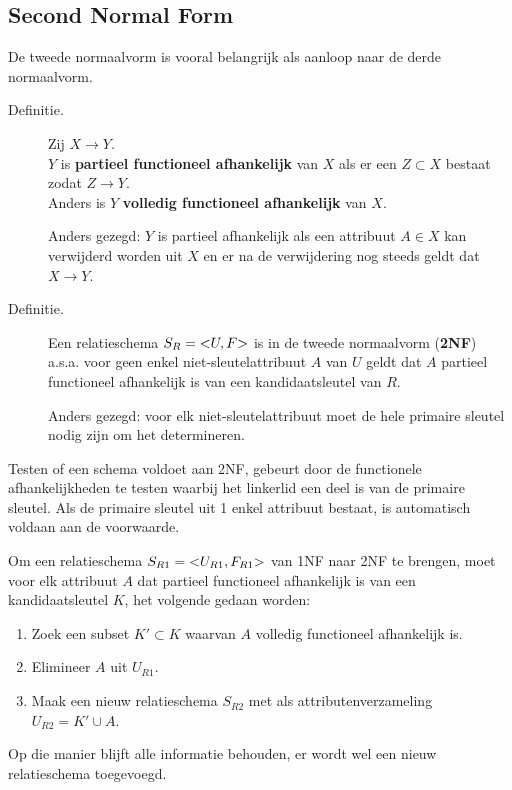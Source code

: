 \subsection{Second Normal Form}
De tweede normaalvorm is vooral belangrijk als aanloop naar de derde normaalvorm.
\begin{description}
	\item[Definitie.] Zij $X \rightarrow Y$.\\
	$Y$ is \textbf{partieel functioneel afhankelijk} van $X$ als er een $Z \subset X$ bestaat zodat $Z \rightarrow Y$.\\
	Anders is $Y$ \textbf{volledig functioneel afhankelijk} van $X$.

	Anders gezegd: $Y$ is partieel afhankelijk als een attribuut $A \in X$ kan verwijderd worden uit $X$ en er na de verwijdering nog steeds geldt dat $X \rightarrow Y$.

	\item[Definitie.] Een relatieschema $S_R = \text{\textless} U,F \text{\textgreater}$ is in de tweede normaalvorm (\textbf{2NF}) a.s.a. voor geen enkel niet-sleutelattribuut $A$ van $U$ geldt dat $A$ partieel functioneel afhankelijk is van een kandidaatsleutel van $R$.

	Anders gezegd: voor elk niet-sleutelattribuut moet de hele primaire sleutel nodig zijn om het determineren.
\end{description}
Testen of een schema voldoet aan 2NF, gebeurt door de functionele afhankelijkheden te testen waarbij het linkerlid een deel is van de primaire sleutel. Als de primaire sleutel uit 1 enkel attribuut bestaat, is automatisch voldaan aan de voorwaarde.

Om een relatieschema $S_{R1} = \text{\textless} U_{R1}, F_{R1} \text{\textgreater}$ van 1NF naar 2NF te brengen, moet voor elk attribuut $A$ dat partieel functioneel afhankelijk is van een kandidaatsleutel $K$, het volgende gedaan worden:
\begin{enumerate}
	\item Zoek een subset $K' \subset K$ waarvan $A$ volledig functioneel afhankelijk is.
	\item Elimineer $A$ uit $U_{R1}$.
	\item Maak een nieuw relatieschema $S_{R2}$ met als attributenverzameling $U_{R2} = K' \cup A$.
\end{enumerate}
Op die manier blijft alle informatie behouden, er wordt wel een nieuw relatieschema toegevoegd.


